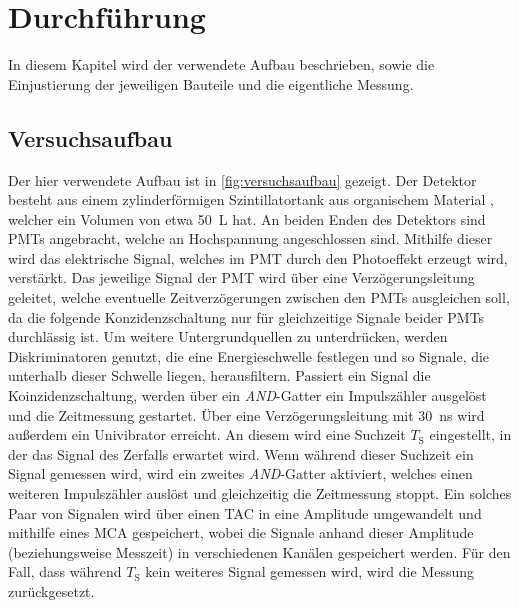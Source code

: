 \section{Durchführung}
\label{sec:durchfuehrung}

In diesem Kapitel wird der verwendete Aufbau beschrieben,
sowie die Einjustierung der jeweiligen Bauteile und die eigentliche Messung. %


\subsection{Versuchsaufbau}

Der hier verwendete Aufbau ist in \autoref{fig:versuchsaufbau} gezeigt.
Der Detektor besteht aus einem zylinderförmigen Szintillatortank aus organischem Material \cite{kolanoskiwermes},
welcher ein Volumen von etwa \SI{50}{\liter} hat.
An beiden Enden des Detektors sind \acp{PMT} \cite{wrleo} angebracht,
welche an Hochspannung angeschlossen sind.
Mithilfe dieser wird das elektrische Signal,
welches im \ac{PMT} durch den Photoeffekt erzeugt wird,
verstärkt.
Das jeweilige Signal der \ac{PMT} wird über eine Verzögerungsleitung geleitet,
welche eventuelle Zeitverzögerungen zwischen den \acp{PMT} ausgleichen soll,
da die folgende Konzidenzschaltung nur für gleichzeitige Signale beider \acp{PMT} durchlässig ist.
Um weitere Untergrundquellen zu unterdrücken,
werden Diskriminatoren genutzt,
die eine Energieschwelle festlegen und so Signale,
die unterhalb dieser Schwelle liegen,
herausfiltern.
Passiert ein Signal die Koinzidenzschaltung,
werden über ein \textit{AND}-Gatter ein Impulszähler ausgelöst und die Zeitmessung gestartet.
Über eine Verzögerungsleitung mit \SI{30}{\nano\second} wird außerdem ein Univibrator erreicht.
An diesem wird eine Suchzeit $T_\text{S}$ eingestellt,
in der das Signal des Zerfalls erwartet wird.
Wenn während dieser Suchzeit ein Signal gemessen wird,
wird ein zweites \textit{AND}-Gatter aktiviert,
welches einen weiteren Impulszähler auslöst und gleichzeitig die Zeitmessung stoppt.
Ein solches Paar von Signalen wird über einen \ac{TAC} \cite{wrleo} in eine Amplitude umgewandelt und mithilfe eines \ac{MCA} \cite{wrleo} gespeichert, %
wobei die Signale anhand dieser Amplitude (beziehungsweise Messzeit)
in verschiedenen Kanälen gespeichert werden.
Für den Fall,
dass während $T_\text{S}$ kein weiteres Signal gemessen wird,
wird die Messung zurückgesetzt.

